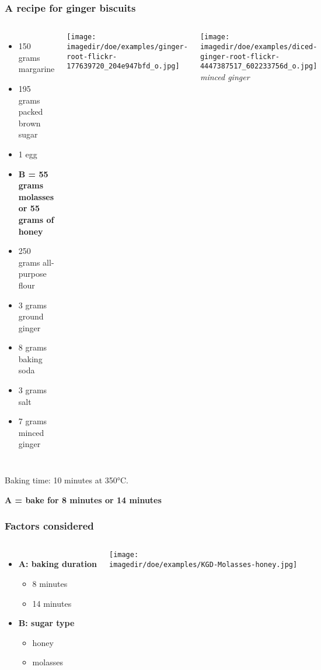 \begin{frame}\frametitle{A recipe for ginger biscuits}
	\begin{columns}[t]
			\begin{itemize}
				\item	150 grams margarine
				\item	195 grams packed brown sugar
				\item	1 egg
				\item		\textbf{B = 55 grams molasses or 55 grams of honey}
				\item	250 grams all-purpose flour
				\item	3 grams ground ginger
				\item	8 grams baking soda
				\item	3 grams salt
				\item	7 grams minced ginger
			\end{itemize}
		
			\texttt{[image: \\imagedir/doe/examples/ginger-root-flickr-177639720\_204e947bfd\_o.jpg]}
			
			\texttt{[image: \\imagedir/doe/examples/diced-ginger-root-flickr-4447387517\_602233756d\_o.jpg]}
			\\
			
			\emph{minced ginger}
	\end{columns}
		
	Baking time: 10 minutes at 350°C.
	
	\vspace{12pt}
	\textbf{A = bake for 8 minutes or 14 minutes}
\end{frame}

\begin{frame}\frametitle{Factors considered}	
	\begin{columns}[b]
			\begin{itemize}
				\item	\textbf{A: baking duration}
					\begin{itemize}
						\item	8 minutes
						\item	14 minutes
					\end{itemize}
					
				\vspace{24pt}
				\item	\textbf{B: sugar type}
				\begin{itemize}
					\item	honey
					\item	molasses
				\end{itemize}
			\end{itemize}
			\texttt{[image: \\imagedir/doe/examples/KGD-Molasses-honey.jpg]}
	\end{columns}
\end{frame}

